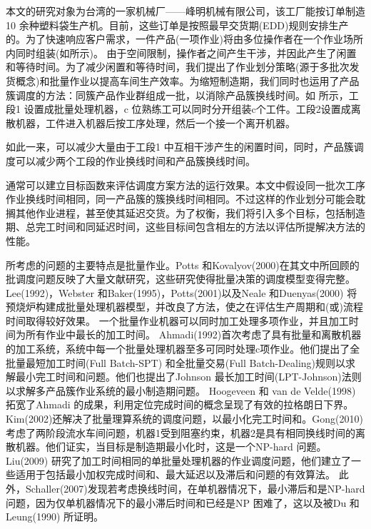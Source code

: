本文的研究对象为台湾的一家机械厂——峰明机械有限公司，该工厂能按订单制造10 余种塑料袋生产机。目前，这些订单是按照最早交货期(EDD)规则安排生产的。为了快速响应客户需求，一件产品(一项作业)将由多位操作者在一个作业场所内同时组装(如所示)。
由于空间限制，操作者之间产生干涉，并因此产生了闲置和等待时间。为了减少闲置和等待时间，我们提出了作业划分策略(源于多批次发货概念)和批量作业以提高车间生产效率。为缩短制造期，我们同时也运用了产品簇调度的方法：同簇产品作业群组成一批，以消除产品簇换线时间。如 所示，工段1 设置成批量处理机器，c 位熟练工可以同时分开组装c个工件。工段2设置成离散机器，工件进入机器后按工序处理，然后一个接一个离开机器。
\begin{figure}[h]
\begin{floatrow}[2]
\centering
{}
\end{floatrow}
\end{figure}
如此一来，可以减少大量由于工段1 中互相干涉产生的闲置时间，同时，产品簇调度可以减少两个工段的作业换线时间和产品簇换线时间。

通常可以建立目标函数来评估调度方案方法的运行效果。本文中假设同一批次工序作业换线时间相同，同一产品簇的簇换线时间相同。不过这样的作业划分可能会耽搁其他作业进程，甚至使其延迟交货。为了权衡，我们将引入多个目标，包括制造期、总完工时间和同延迟时间，这些目标间包含相左的方法以评估所提解决方法的性能。

所考虑的问题的主要特点是批量作业。Potts 和Kovalyov(2000)在其文中所回顾的批调度问题反映了大量文献研究，这些研究使得批量决策的调度模型变得完整。Lee(1992)，Webster 和Baker(1995)，Potts(2001)以及Neale 和Duenyas(2000) 将预烧炉构建成批量处理机器模型，并改良了方法，使之在评估生产周期和(或)流程时间取得较好效果。
一个批量作业机器可以同时加工处理多项作业，并且加工时间为所有作业中最长的加工时间。
Ahmadi(1992)首次考虑了具有批量和离散机器的加工系统，系统中每一个批量处理机器至多可同时处理c项作业。他们提出了全批量最短加工时间(Full Batch-SPT) 和全批量交易(Full Batch-Dealing)规则以求解最小完工时间和问题。他们也提出了Johnson 最长加工时间(LPT-Johnson)法则以求解多产品簇作业系统的最小制造期问题。
Hoogeveen 和 van de Velde(1998)拓宽了Ahmadi 的成果，利用定位完成时间的概念呈现了有效的拉格朗日下界。Kim(2002)还解决了批量理算系统的调度问题，以最小化完工时间和。Gong(2010)考虑了两阶段流水车间问题，机器1受到阻塞约束，机器2是具有相同换线时间的离散机器。他们证实，当目标是制造期最小化时，这是一个NP-hard 问题。Liu(2009) 研究了加工时间相同的单批量处理机器的作业调度问题，他们建立了一些适用于包括最小加权完成时间和、最大延迟以及滞后和问题的有效算法。
此外，Schaller(2007)发现若考虑换线时间，在单机器情况下，最小滞后和是NP-hard 问题，因为仅单机器情况下的最小滞后时间和已经是NP 困难了，这以及被Du 和Leung(1990) 所证明。

